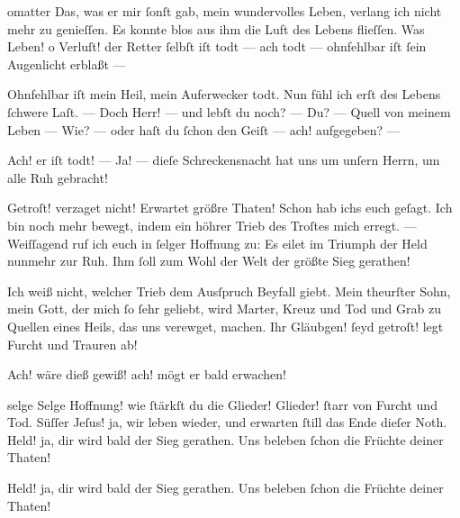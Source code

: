 \documentclass{ees}
\begin{document}
{\begin{movement}{omatter}
    \voice[Eidli]
    Das, was er mir ſonſt gab, mein wundervolles Leben,
    verlang ich nicht mehr zu genieſſen.
    Es konnte blos aus ihm die Luft des Lebens flieſſen.
    Was Leben! o Verluſt! der Retter ſelbſt iſt todt —
    ach todt — ohnfehlbar iſt ſein Augenlicht erblaßt —

    \voice[Lazarus]
    Ohnfehlbar iſt mein Heil, mein Auferwecker todt.
    Nun fühl ich erſt des Lebens ſchwere Laſt. —
    Doch Herr! — und lebſt du noch? — Du? — Quell von meinem Leben —
    Wie? — oder haſt du ſchon den Geiſt — ach! aufgegeben? —

    Ach! er iſt todt! — Ja! — dieſe Schreckensnacht
    hat uns um unſern Herrn, um alle Ruh gebracht!

    \voice[Johannes]
    Getroſt! verzaget nicht! Erwartet größre Thaten!
    Schon hab ichs euch geſagt. Ich bin noch mehr bewegt,
    indem ein höhrer Trieb des Troſtes mich erregt. —
    Weiſſagend ruf ich euch in ſelger Hoffnung zu:
    Es eilet im Triumph der Held nunmehr zur Ruh.
    Ihm ſoll zum Wohl der Welt der größte Sieg gerathen!

    \voice[Maria]
    Ich weiß nicht, welcher Trieb dem Ausſpruch Beyfall giebt.
    Mein theurſter Sohn, mein Gott, der mich ſo ſehr geliebt,
    wird Marter, Kreuz und Tod und Grab
    zu Quellen eines Heils, das uns verewget, machen.
    Ihr Gläubgen! ſeyd getroſt! legt Furcht und Trauren ab!

    Ach! wäre dieß gewiß! ach! mögt er bald erwachen!
  \end{movement}

  \begin{movement}{selge}
    \voice[Maria]
    Selge Hoffnung! wie ſtärkſt du die Glieder!
    Glieder! ſtarr von Furcht und Tod.
    Süſſer Jeſus! ja, wir leben wieder,
    und erwarten ſtill das Ende dieſer Noth.
    Held! ja, dir wird bald der Sieg gerathen.
    Uns beleben ſchon die Früchte deiner Thaten!

    Held! ja, dir wird bald der Sieg gerathen.
    Uns beleben ſchon die Früchte deiner Thaten!
  \end{movement}






}

\eesScore
\end{document}
